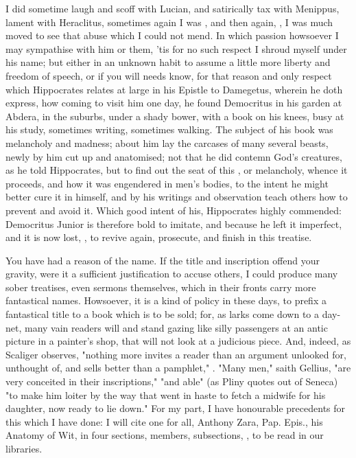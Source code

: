 I did sometime laugh and scoff with Lucian, and satirically tax with Menippus,
lament with Heraclitus, sometimes again I was , and then again, , I was much moved to see that abuse which I
could not mend. In which passion howsoever I may sympathise with him or them,
'tis for no such respect I shroud myself under his name; but either in an
unknown habit to assume a little more liberty and freedom of speech, or if you
will needs know, for that reason and only respect which Hippocrates relates at
large in his Epistle to Damegetus, wherein he doth express, how coming to visit
him one day, he found Democritus in his garden at Abdera, in the suburbs,
under a shady bower, with a book on his
knees, busy at his study, sometimes writing, sometimes walking. The subject of
his book was melancholy and madness; about him lay the carcases of many several
beasts, newly by him cut up and anatomised; not that he did contemn God's
creatures, as he told Hippocrates, but to find out the seat of this , or melancholy, whence it proceeds, and how it was engendered in men's
bodies, to the intent he might better cure it in himself, and by his writings
and observation teach others how to prevent and avoid it.
Which good intent of his, Hippocrates highly commended: Democritus Junior is
therefore bold to imitate, and because he left it imperfect, and it is now
lost, , to revive again, prosecute, and
finish in this treatise.

You have had a reason of the name. If the title and inscription offend your
gravity, were it a sufficient justification to accuse others, I could produce
many sober treatises, even sermons themselves, which in their fronts carry more
fantastical names. Howsoever, it is a kind of policy in these days, to prefix a
fantastical title to a book which is to be sold; for, as larks come down to a
day-net, many vain readers will  and stand gazing like
silly passengers at an antic picture in a painter's shop, that will not look at
a judicious piece. And, indeed, as Scaliger observes,
"nothing more invites a reader than an argument unlooked for, unthought of, and
sells better than a  pamphlet," . "Many men," saith
Gellius, "are very conceited in their inscriptions," "and able" (as
Pliny quotes out of Seneca) "to make him loiter by the way
that went in haste to fetch a midwife for his daughter, now ready to lie down."
For my part, I have honourable precedents for this which I
have done: I will cite one for all, Anthony Zara, Pap. Epis., his Anatomy of
Wit, in four sections, members, subsections, \etc{}, to be read in our
libraries.

